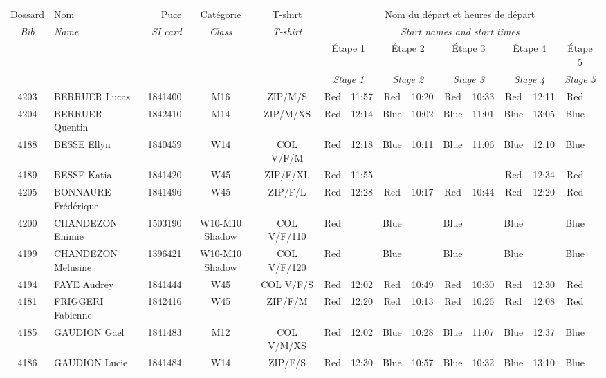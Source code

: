 \documentclass{report}
\begin{document}
  \begin{longtable}{|c|l|r|c|c|*{5}{cc|}}
    Dossard & Nom  & Puce    & Catégorie & T-shirt & \multicolumn{10}{c|}{Nom du départ et heures de départ} \\
    \itshape Bib     & \itshape Name & \itshape SI card & \itshape Class  & \itshape  T-shirt  & \multicolumn{10}{c|}{\itshape Start names and start times} \\
    \hline
    & & & & & \multicolumn{2}{c|}{Étape 1} & \multicolumn{2}{c|}{Étape 2} & \multicolumn{2}{c|}{Étape 3} & \multicolumn{2}{c|}{Étape 4} & \multicolumn{2}{c|}{Étape 5} \\
    & & & & & \multicolumn{2}{c|}{\itshape Stage 1} & \multicolumn{2}{c|}{\itshape Stage 2} & \multicolumn{2}{c|}{\itshape Stage 3} & \multicolumn{2}{c|}{\itshape Stage 4} & \multicolumn{2}{c|}{\itshape Stage 5} \\
    \hline
    4203 & BERRUER Lucas & 1841400 & M16 & ZIP/M/S & Red & 11:57 & Red & 10:20 & Red & 10:33 & Red & 12:11 & Red &  \\
    4204 & BERRUER Quentin & 1842410 & M14 & ZIP/M/XS & Red & 12:14 & Blue & 10:02 & Blue & 11:01 & Blue & 13:05 & Blue &  \\
    4188 & BESSE Ellyn & 1840459 & W14 & COL V/F/M & Red & 12:18 & Blue & 10:11 & Blue & 11:06 & Blue & 12:10 & Blue &  \\
    4189 & BESSE Katia & 1841420 & W45 & ZIP/F/XL & Red & 11:55 & - &  - & - &  - & Red & 12:34 & Red &  \\
    4205 & BONNAURE Frédérique & 1841496 & W45 & ZIP/F/L & Red & 12:28 & Red & 10:17 & Red & 10:44 & Red & 12:20 & Red &  \\
    4200 & CHANDEZON Enimie & 1503190 & W10-M10 Shadow & COL V/F/110 & Red &   & Blue &   & Blue &   & Blue &   & Blue &  \\
    4199 & CHANDEZON Melusine & 1396421 & W10-M10 Shadow & COL V/F/120 & Red &   & Blue &   & Blue &   & Blue &   & Blue &  \\
    4194 & FAYE Audrey & 1841444 & W45 & COL V/F/S & Red & 12:02 & Red & 10:49 & Red & 10:30 & Red & 12:30 & Red &  \\
    4181 & FRIGGERI Fabienne & 1842416 & W45 & ZIP/F/M & Red & 12:20 & Red & 10:13 & Red & 10:26 & Red & 12:08 & Red &  \\
    4185 & GAUDION Gael & 1841483 & M12 & COL V/M/XS & Red & 12:02 & Blue & 10:28 & Blue & 11:07 & Blue & 12:37 & Blue &  \\
    4186 & GAUDION Lucie & 1841484 & W14 & ZIP/F/S & Red & 12:30 & Blue & 10:57 & Blue & 10:32 & Blue & 13:10 & Blue &  \\

\end{longtable}
\end{document}
